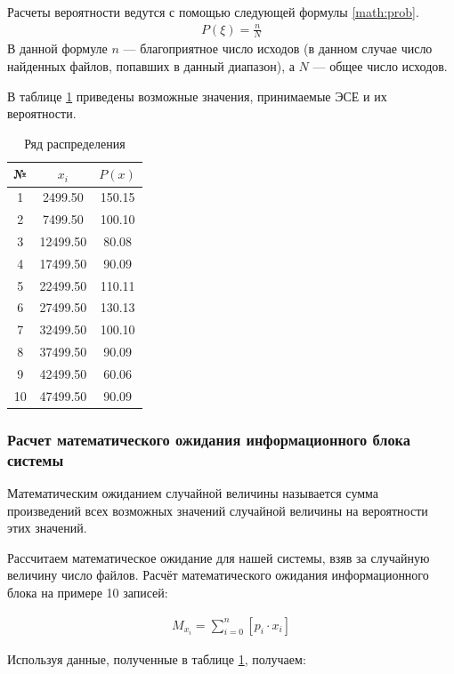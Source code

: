 \documentclass[a4paper,14pt]{extarticle}
\begin{document}
Расчеты вероятности ведутся с
помощью следующей формулы  \ref{math:prob}.
\begin{align}
P(\xi)=\frac{n}N \label{math:prob}
\end{align}
В данной формуле $n$ --- благоприятное число исходов (в данном
случае число найденных файлов, попавших в данный диапазон), а $N$ --- общее число исходов. 

В таблице \ref{tab:probs} приведены возможные значения, принимаемые ЭСЕ и их вероятности.

\begin{table}[h!]
	\centering
	\caption{Ряд распределения}
	\begin{tabular}{|c|c|c|}
		\hline
		№ &	$x_i$ & $P(x)$ \\ \hline\hline
		1 &	2499.50 & 150.15 \\ \hline
		2 &		7499.50 & 100.10 \\ \hline
		3 &		12499.50 & 80.08 \\ \hline
		4 &		17499.50 & 90.09 \\ \hline
		5 &		22499.50 & 110.11 \\ \hline
		6 &		27499.50 & 130.13 \\ \hline
		7 &		32499.50 & 100.10 \\ \hline
		8 &		37499.50 & 90.09 \\ \hline
		9 &		42499.50 & 60.06 \\ \hline
		10 &		47499.50 & 90.09 \\ \hline
	\end{tabular}
	\label{tab:probs}
\end{table}

\subsubsection{Расчет математического ожидания информационного блока системы}
Математическим ожиданием случайной величины называется сумма
произведений всех возможных значений случайной величины на вероятности
этих значений. 

Рассчитаем математическое ожидание для нашей системы, взяв
за случайную величину число файлов. Расчёт математического
ожидания информационного блока на примере 10 записей:

\begin{align}
M_{x_{i}} = \sum_{i=0}^{n}\left[p_i \cdot x_i\right] \label{math:expectation}
\end{align}

\newpage
Используя данные, полученные в таблице \ref{tab:probs}, получаем:
\end{document}
